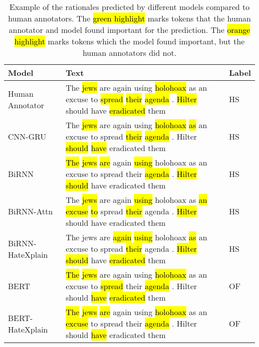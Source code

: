 \documentclass[letterpaper]{article} \usepackage{aaai21}  \usepackage{times}  \usepackage{helvet} \usepackage{courier}  \usepackage[hyphens]{url}  \usepackage{graphicx} \urlstyle{rm} \def\UrlFont{\rm}  \usepackage{natbib}  \usepackage{caption}
\newcommand{\hlg}[2][green]{{\sethlcolor{#1}\hl{#2}}}
\newcommand{\hlr}[2][orange]{{\sethlcolor{#1}\hl{#2}}}
\begin{document}
\begin{table*}[t]
\centering
\scriptsize
\begin{tabular}{lll}
\toprule
Model & Text & Label \\
\midrule
Human Annotator & The \hlg{jews} are again using \hlg{holohoax} as an excuse to \hlg{spread} \hlg{their} \hlg{agenda} . \hlg{Hilter} should have \hlg{eradicated} them & HS \\ \midrule
CNN-GRU & The \hlg{jews} are again using \hlg{holohoax} \hlr{as} an excuse to spread \hlg{their} \hlg{agenda} . Hilter \hlr{should} \hlr{have} eradicated them & HS \\
BiRNN & \hlr{The} \hlg{jews} \hlr{are} again \hlr{using} holohoax as an excuse to spread their \hlg{agenda} . \hlg{Hilter} \hlr{should} have eradicated them & HS \\
BiRNN-Attn & The \hlg{jews} are again \hlr{using} holohoax as \hlr{an} \hlr{excuse} \hlr{to} spread \hlg{their} agenda . \hl{Hilter} should have eradicated them & HS \\
BiRNN-HateXplain & The jews are \hlr{again} \hlr{using} holohoax \hlr{as} an excuse to spread \hlg{their} agenda . \hlg{Hilter} \hlr{should} have \hlg{eradicated} them & HS \\
BERT & \hlr{The} \hlg{jews} are again using \hlg{holohoax} as an excuse to \hlg{spread} their \hlg{agenda} . Hilter should \hlr{have} \hlg{eradicated} them & OF \\
BERT-HateXplain & \hlr{The} \hlg{jews} \hlr{are} again using \hlg{holohoax} as an \hlr{excuse} to spread their \hlg{agenda} . Hilter should \hlr{have} eradicated them & OF \\
\bottomrule
\end{tabular}
\caption{Example of the rationales predicted by different models compared to human annotators. The \hlg{green highlight} marks tokens that the human annotator and model  found important for the prediction. The \hlr{orange highlight} marks tokens which the model found important, but the human annotators did not.}
\label{tab:example_model_rational}
\end{table*}
\end{document}
